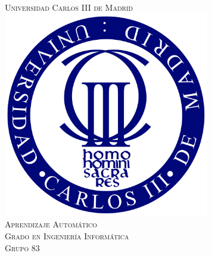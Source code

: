 \documentclass[12pt]{article}
\begin{document}
\begin{titlepage}

\newcommand{\HRule}{\rule{\linewidth}{0.5mm}} %

\center %


\textsc{\LARGE Universidad Carlos III de Madrid}\\[1.2cm] %


\includegraphics[width=9cm]{Logo}\\[1.2cm] %

\textsc{\Large Aprendizaje Automático}\\[0.5cm] %
\textsc{\large Grado en Ingeniería Informática}\\[0.6cm] %
\textsc{\large Grupo 83}\\[0.5cm]



\end{titlepage}
\end{document}
